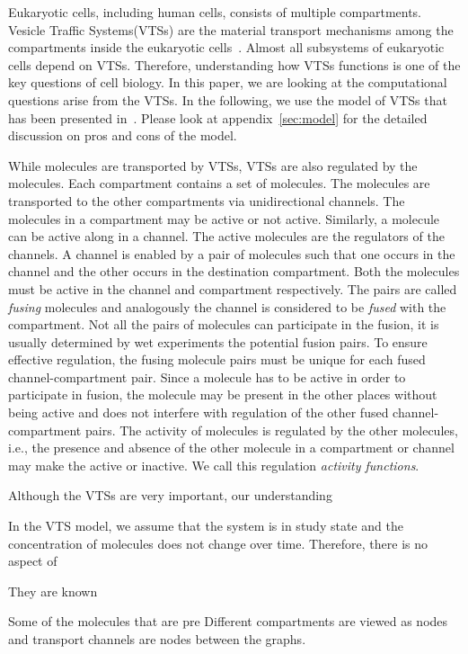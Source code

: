 Eukaryotic cells, including human cells, consists of multiple compartments.
%
Vesicle Traffic Systems(VTSs) are the material transport mechanisms
among the compartments inside the eukaryotic cells~\cite{vtsIntro}.
%
Almost all subsystems of eukaryotic cells depend on VTSs.
%
Therefore, understanding how VTSs functions is one of the key
questions of cell biology.
%
In this paper, we are looking at the computational questions 
arise from the VTSs.
%
In the following, we use the model of VTSs that has been presented
in~\cite{VTS}.
%
Please look at appendix~\ref{sec:model}
for the detailed discussion on pros and cons of the model.

While molecules are transported by VTSs, VTSs are also
regulated by the molecules.
%
Each compartment contains a set of molecules.
%
The molecules are transported to the other compartments via
unidirectional channels.  
%
The molecules in a compartment may be active or not active.
%
Similarly, a molecule can be active along in a channel. 
%
The active molecules are the regulators of the channels.
%
A channel is enabled by a pair of molecules
such that one occurs in the channel and the other
occurs in the destination compartment.
%
Both the molecules must be active in the channel
and compartment respectively.
%
The pairs are called {\em fusing} molecules and analogously
the channel is considered to be {\em fused} with the
compartment.
%
Not all the pairs of molecules can participate in the fusion, it is
usually determined by wet experiments the potential fusion pairs.
%
To ensure effective regulation, the fusing molecule pairs must be
unique for each fused channel-compartment pair.
%
Since a molecule has to be active in order to participate in fusion,
the molecule may be present in the other places without being active
and does not interfere with regulation of the other fused
channel-compartment pairs.
%
The activity of molecules is regulated by the other molecules, i.e.,
the presence and absence of the other molecule in a compartment or
channel may make the active or inactive.
%
We call this regulation {\em activity functions}.


Although the VTSs are very important, our understanding 


In the VTS model, we assume that the system is in study state and
the concentration of molecules does not change over time.
%
Therefore, there is no aspect of 

%
They are known 

Some of the molecules that are pre
%
%
Different compartments are viewed as nodes and transport channels are
nodes between the graphs.

